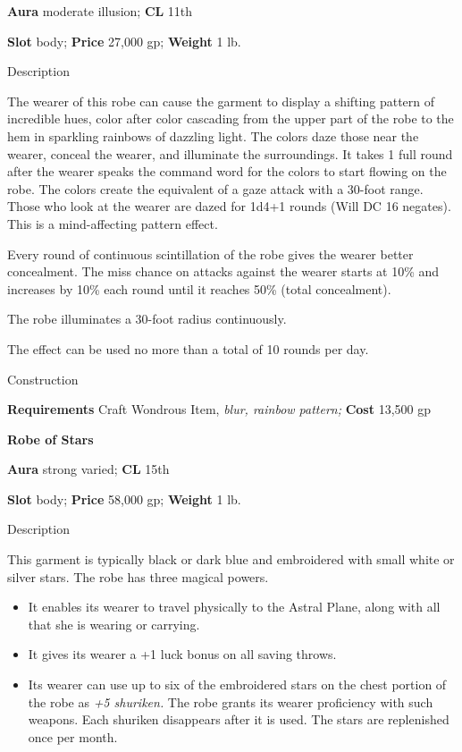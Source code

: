 \textbf{Aura} moderate illusion;\textbf{ CL }11th
				
\textbf{Slot} body; \textbf{Price} 27,000 gp; \textbf{Weight} 1 lb.
				
Description
				
The wearer of this robe can cause the garment to display a shifting pattern of incredible hues, color after color cascading from the upper part of the robe to the hem in sparkling rainbows of dazzling light. The colors daze those near the wearer, conceal the wearer, and illuminate the surroundings. It takes 1 full round after the wearer speaks the command word for the colors to start flowing on the robe. The colors create the equivalent of a gaze attack with a 30-foot range. Those who look at the wearer are dazed for 1d4+1 rounds (Will DC 16 negates). This is a mind-affecting pattern effect.
				
Every round of continuous scintillation of the robe gives the wearer better concealment. The miss chance on attacks against the wearer starts at 10\% and increases by 10\% each round until it reaches 50\% (total concealment).
				
The robe illuminates a 30-foot radius continuously.
				
The effect can be used no more than a total of 10 rounds per day. 
				
Construction
				
\textbf{Requirements} Craft Wondrous Item,\textit{ blur, rainbow pattern;}\textbf{ Cost }13,500 gp
				
\textbf{Robe of Stars}
				
\textbf{Aura} strong varied;\textbf{ CL }15th
				
\textbf{Slot} body; \textbf{Price} 58,000 gp; \textbf{Weight} 1 lb.
				
Description
				
This garment is typically black or dark blue and embroidered with small white or silver stars. The robe has three magical powers.
				\begin{itemize}\item  It enables its wearer to travel physically to the Astral Plane, along with all that she is wearing or carrying.
				\item  It gives its wearer a +1 luck bonus on all saving throws.
				\item  Its wearer can use up to six of the embroidered stars on the chest portion of the robe as \textit{+5 shuriken.} The robe grants its wearer proficiency with such weapons. Each shuriken disappears after it is used. The stars are replenished once per month.
\end{itemize}
				
